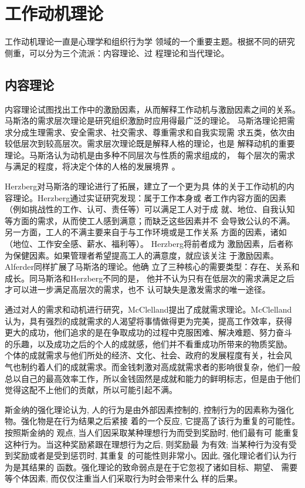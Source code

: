 \documentclass[12pt,a4paper]{ctexart}
\begin{document}
\section{工作动机理论}
工作动机理论一直是心理学和组织行为学
领域的一个重要主题。根据不同的研究侧重，可以分为三个流派：内容理论、过
程理论和当代理论。

\subsection{内容理论}
内容理论试图找出工作中的激励因素，从而解释工作动机与激励因素之间的关系。
马斯洛的需求层次理论是研究组织激励时应用得最广泛的理论。
马斯洛理论把需求分成生理需求、安全需求、社交需求、尊重需求和自我实现需
求五类，依次由较低层次到较高层次。需求层次理论既是解释人格的理论，也是
解释动机的重要理论。马斯洛认为动机是由多种不同层次与性质的需求组成的，
每个层次的需求与满足的程度，将决定个体的人格的发展境界
\cite{Maslow1943}。

Herzberg对马斯洛的理论进行了拓展，建立了一个更为具
体的关于工作动机的内容理论。Herzberg通过实证研究发现：属于工作本身或
者工作内容方面的因素（例如挑战性的工作、认可、责任等）可以满足工人对于成
就、地位、自我认知等方面的需求，从而使工人感到满意；而缺乏这些因素并不
会导致公认的不满。另一方面，工人的不满主要来自于与工作环境或是工作关系
方面的因素，诸如（地位、工作安全感、薪水、福利等）。
Herzberg将前者成为
激励因素，后者称为保健因素。如果管理者希望提高工人的满意度，就应该关注
于激励因素\cite{hertzberg1959mw}。Alferder同样扩展了马斯洛的理论。他确
立了三种核心的需要类型：存在、关系和成长。同马斯洛和Herzberg不同的是，
他并不认为只有在低层次的需求满足之后才可以进一步满足高层次的需求，也不
认可缺失是激发需求的唯一途径\cite{alderfer:era}。

通过对人的需求和动机进行研究，McClelland提出了成就需求理论。McClelland
认为，具有强烈的成就需求的人渴望将事情做得更为完美，提高工作效率，获得
更大的成功，他们追求的是在争取成功的过程中克服困难、解决难题、努力奋斗
的乐趣，以及成功之后的个人的成就感，他们并不看重成功所带来的物质奖励。
个体的成就需求与他们所处的经济、文化、社会、政府的发展程度有关，社会风
气也制约着人们的成就需求。而金钱刺激对高成就需求者的影响很复杂，他们一般总以自己的最高效率工作，所以金钱固然是成就和能力的鲜明标志，但是由于他们觉得这配不上他们的贡献，所以可能引起不满\cite{mcclelland1976am}。

斯金纳的强化理论认为, 人的行为是由外部因素控制的,
控制行为的因素称为强化物。强化物是在行为结果之后紧接
着的一个反应, 它提高了该行为重复的可能性。按照斯金纳的
观点, 当人们因采取某种理想行为而受到奖励时, 他们最有可
能重复这种行为。当这种奖励紧跟在理想行为之后, 则奖励最
为有效; 当某种行为没有受到奖励或者是受到惩罚时, 其重复
的可能性则非常小。因此, 强化理论者们认为行为是其结果的
函数\cite{skinner1938boe}\cite{ferster1957sr}。强化理论的致命弱点是在于它忽视了诸如目标、期望、
需要等个体因素, 而仅仅注重当人们采取行为时会带来什么
样的后果。
\end{document}
